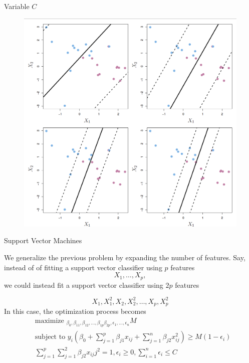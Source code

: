 \documentclass{beamer}
\begin{document}
\begin{frame}{Variable $C$}
	
		\begin{figure}[h]
	\centering
	\includegraphics[scale=0.35]{../../Figures/fig_changing_c_svm.png}
\end{figure}
	
\end{frame}

\begin{frame}{Support Vector Machines}
	
	We generalize the previous problem by expanding the number of features. Say, instead of of fitting a support vector classifier using $p$ features
	\begin{equation*}
		X_1,\ldots, X_p,
	\end{equation*}
we could instead fit a support vector classifier using $2p$ features 

\begin{equation*}
	X_1,X_1^2,X_2,X_2^2,\ldots, X_p,X_p^2
\end{equation*}
In this case, the optimization process becomes
\begin{equation*}
	\begin{split}
		&\textrm{maximize }_{\beta_0,\beta_{11},\beta_{12},\ldots,\beta_{1p} \beta_{2p},\epsilon_1,\ldots,\epsilon_n} M \\
		&\textrm{subject to } y_i (\beta_0 + \sum_{j=1}^p \beta_{j1} x_{ij} + \sum_{j=1}^n \beta_{j2}x_{ij}^2)\ge M (1-\epsilon_i) \\
		&\sum_{j=1}^p \sum_{j=1}^2 \beta_{j2}x_{ij}j^2 =1 ,  \epsilon_i \ge 0, \sum_{i=1}^n \epsilon_i \le C 
	\end{split}
\end{equation*}
\end{frame}
\end{document}
